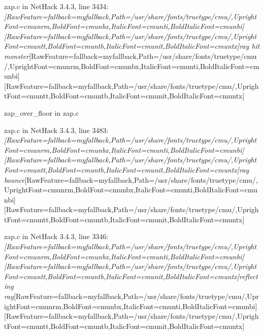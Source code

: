 \begin{myenumerate}
\item{} zap.c in NetHack 3.4.3, line 3434\footnotemark[208]: {\itshape \allowbreak{}\setmainfont{cmunti.ttf}[RawFeature={fallback=myfallback},Path=/usr/share/fonts/truetype/cmu/,UprightFont=cmunrm,BoldFont=cmunbx,ItalicFont=cmunti,BoldItalicFont=cmunbi]\setmonofont{cmunti.ttf}[RawFeature={fallback=myfallback},Path=/usr/share/fonts/truetype/cmu/,UprightFont=cmuntt,BoldFont=cmuntb,ItalicFont=cmunit,BoldItalicFont=cmuntx]\itshape ray hit monster}\allowbreak{}\setmainfont{cmunrm.ttf}[RawFeature={fallback=myfallback},Path=/usr/share/fonts/truetype/cmu/,UprightFont=cmunrm,BoldFont=cmunbx,ItalicFont=cmunti,BoldItalicFont=cmunbi]\setmonofont{cmunrm.ttf}[RawFeature={fallback=myfallback},Path=/usr/share/fonts/truetype/cmu/,UprightFont=cmuntt,BoldFont=cmuntb,ItalicFont=cmunit,BoldItalicFont=cmuntx]
     

\item{} zap\_over\_floor\footnotemark[209] in zap.c\footnotemark[210]

\item{} zap.c in NetHack 3.4.3, line 3483\footnotemark[211]: {\itshape \allowbreak{}\setmainfont{cmunti.ttf}[RawFeature={fallback=myfallback},Path=/usr/share/fonts/truetype/cmu/,UprightFont=cmunrm,BoldFont=cmunbx,ItalicFont=cmunti,BoldItalicFont=cmunbi]\setmonofont{cmunti.ttf}[RawFeature={fallback=myfallback},Path=/usr/share/fonts/truetype/cmu/,UprightFont=cmuntt,BoldFont=cmuntb,ItalicFont=cmunit,BoldItalicFont=cmuntx]\itshape ray bounce}\allowbreak{}\setmainfont{cmunrm.ttf}[RawFeature={fallback=myfallback},Path=/usr/share/fonts/truetype/cmu/,UprightFont=cmunrm,BoldFont=cmunbx,ItalicFont=cmunti,BoldItalicFont=cmunbi]\setmonofont{cmunrm.ttf}[RawFeature={fallback=myfallback},Path=/usr/share/fonts/truetype/cmu/,UprightFont=cmuntt,BoldFont=cmuntb,ItalicFont=cmunit,BoldItalicFont=cmuntx]
     

\item{} zap.c in NetHack 3.4.3, line 3346\footnotemark[212]: {\itshape \allowbreak{}\setmainfont{cmunti.ttf}[RawFeature={fallback=myfallback},Path=/usr/share/fonts/truetype/cmu/,UprightFont=cmunrm,BoldFont=cmunbx,ItalicFont=cmunti,BoldItalicFont=cmunbi]\setmonofont{cmunti.ttf}[RawFeature={fallback=myfallback},Path=/usr/share/fonts/truetype/cmu/,UprightFont=cmuntt,BoldFont=cmuntb,ItalicFont=cmunit,BoldItalicFont=cmuntx]\itshape reflecting ray}\allowbreak{}\setmainfont{cmunrm.ttf}[RawFeature={fallback=myfallback},Path=/usr/share/fonts/truetype/cmu/,UprightFont=cmunrm,BoldFont=cmunbx,ItalicFont=cmunti,BoldItalicFont=cmunbi]\setmonofont{cmunrm.ttf}[RawFeature={fallback=myfallback},Path=/usr/share/fonts/truetype/cmu/,UprightFont=cmuntt,BoldFont=cmuntb,ItalicFont=cmunit,BoldItalicFont=cmuntx]
     


\end{myenumerate}
